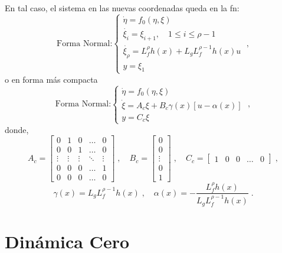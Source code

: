 {En tal caso, el sistema en las nuevas coordenadas queda en la \gls{fn}:
\begin{equation}
	\text{Forma Normal:}
	\begin{cases}
		\dot{\eta} = f_0(\eta, \xi)                            \\
		\dot{\xi_i} = \xi_{i+1}, \quad 1 \leq i \leq \rho-1    \\
		\dot{\xi_\rho} = L_f^\rho h(x) + L_g L_f^{\rho-1}h(x)u \\
		y = \xi_1
	\end{cases} \; ,
	\label{eq:forma_normal}
\end{equation}
o en forma más compacta
\begin{equation}
	\text{Forma Normal:}
	\begin{cases}
		\dot{\eta} = f_0(\eta, \xi)                        \\
		\dot{\xi} = A_c \xi + B_c \gamma(x)[u - \alpha(x)] \\
		y = C_c \xi
	\end{cases} \; ,
	\label{eq:forma_normal_compacta}
\end{equation}
donde,
\begin{equation*}
	A_c = \begin{bmatrix}
		0      & 1      & 0      & \ldots & 0      \\
		0      & 0      & 1      & \ldots & 0      \\
		\vdots & \vdots & \vdots & \ddots & \vdots \\
		0      & 0      & 0      & \ldots & 1      \\
		0      & 0      & 0      & \ldots & 0
	\end{bmatrix} \; , \quad B_c = \begin{bmatrix}
		0      \\
		0      \\
		\vdots \\
		0      \\
		1
	\end{bmatrix} \; , \quad C_c = \begin{bmatrix}
		1 & 0 & 0 & \ldots & 0
	\end{bmatrix} \; ,
\end{equation*}
\begin{equation*}
	\gamma(x) = L_g L_f^{\rho-1} h(x) \; , \quad \alpha(x) = -\dfrac{L_f^\rho h(x)}{L_g L_f^{\rho-1} h(x)} \; .
\end{equation*}
}

\section{Dinámica Cero}

